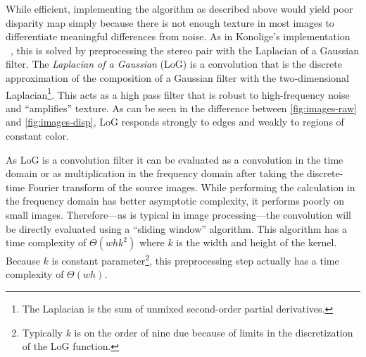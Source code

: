 \documentclass{article}
\let\orgautoref\autoref
\providecommand{\Autoref}
        {\def\equationautorefname{Equation}%
         \def\figureautorefname{Figure}%
         \def\subfigureautorefname{Figure}%
         \def\Itemautorefname{Item}%
         \def\tableautorefname{Table}%
         \def\sectionautorefname{Section}%
         \def\subsectionautorefname{Section}%
         \def\subsubsectionautorefname{Section}%
         \def\chapterautorefname{Section}%
         \def\partautorefname{Part}%
         \orgautoref}
\begin{document}
While efficient, implementing the algorithm as described above would yield poor
disparity map simply because there is not enough texture in most images to
differentiate meaningful differences from noise. As in Konolige's
implementation ~\cite{konolige97}, this is solved by preprocessing the stereo
pair with the Laplacian of a Gaussian filter. The \textit{Laplacian of a
Gaussian} (LoG) is a convolution that is the discrete approximation of the
composition of a Gaussian filter with the two-dimensional
Laplacian\footnote{The Laplacian is the sum of unmixed second-order partial
derivatives.}. This acts as a high pass filter that is robust to high-frequency
noise and ``amplifies'' texture. As can be seen in the difference between
\Autoref{fig:images-raw} and \Autoref{fig:images-disp}, LoG responds strongly
to edges and weakly to regions of constant color.

As LoG is a convolution filter it can be evaluated as a convolution in the time
domain or as multiplication in the frequency domain after taking the
discrete-time Fourier transform of the source images. While performing the
calculation in the frequency domain has better asymptotic complexity, it
performs poorly on small images. Therefore---as is typical in image
processing---the convolution will be directly evaluated using a ``sliding
window'' algorithm. This algorithm has a time complexity of $\Theta(whk^2)$
where $k$ is the width and height of the kernel. Because $k$ is constant
parameter\footnote{Typically $k$ is on the order of nine due because of limits
in the discretization of the LoG function.}, this preprocessing step actually
has a time complexity of $\Theta(wh)$.
\end{document}
